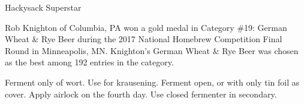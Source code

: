 \documentclass[fontsize=9pt,oneside]{scrbook}
\begin{document}
\mainmatter


\begin{recipe}{Hackysack Superstar}

\begin{aboutblock}
Rob Knighton of Columbia, PA won a gold medal in Category \#19: German Wheat \& Rye
Beer during the 2017 National Homebrew Competition Final Round in Minneapolis, MN.
Knighton's German Wheat \& Rye Beer was chosen as the best among 192 entries in
the category. \sourceaha
\end{aboutblock}


\begin{methodandtiming}
 
\begin{mashsteps}
\end{mashsteps}

\begin{fermentationsteps}
\end{fermentationsteps}

\begin{directions}
Ferment only  of wort. Use  for krausening. Ferment open, or
with only tin foil as cover. Apply airlock on the fourth day. Use closed fermenter
in secondary.
\end{directions}

\end{methodandtiming}

\recipebreak

\begin{ingredientsblock}

\begin{malts}
\end{malts}

\begin{hops}
\end{hops}


\begin{twists}
\end{twists}

\end{ingredientsblock}

\end{recipe}


\end{document}
